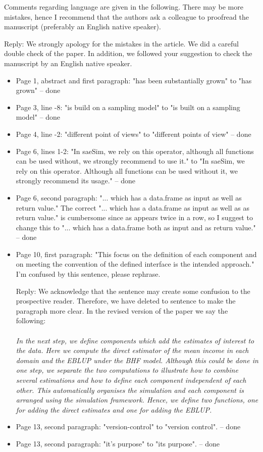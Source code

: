 \documentclass[11pt]{article}
\begin{document}
\vspace{0.5cm}

\noindent Comments regarding language are given in the following. There may be more mistakes, hence I recommend that the authors ask a colleague to proofread the manuscript (preferably an English native speaker).

\noindent Reply: We strongly apology for the mistakes in the article. We did a careful double check of the paper. In addition, we followed your suggestion to check the manuscript by an English native speaker.

\begin{itemize}
\item
	Page 1, abstract and first paragraph: "has been substantially grown" to "has grown" -- done
\item
	Page 3, line -8: "is build on a sampling model" to "is built on a sampling model" -- done
\item
	Page 4, line -2: "different point of views" to "different points of view" -- done
\item
	Page 6, lines 1-2: "In saeSim, we rely on this operator, although all functions can be used without, we strongly recommend to use it." to "In saeSim, we rely on this operator. Although all functions can be used without it, we strongly recommend its usage." -- done
\item
	Page 6, second paragraph: "... which has a data.frame as input as well as return value." The correct "... which has a data.frame as input as well as as return value." is cumbersome since as appears twice in a row, so I suggest to change this to "... which has a data.frame both as input and as return value."  -- done

\item
	Page 10, first paragraph: "This focus on the definition of each component and on meeting the convention of the defined interface is the intended approach." I'm confused by this sentence, please rephrase.
	
	Reply: We acknowledge that the sentence may create some confusion to the prospective reader. Therefore, we have deleted to sentence to make the paragraph more clear. In the revised version of the paper we say the following:\\\\
	\textit{
		In the next step, we define components which add the estimates of interest to the data. Here we compute the direct estimator of the mean income in each domain and the EBLUP under the BHF model. Although this could be done in one step, we separate the two computations to illustrate how to combine several estimations and how to define each component independent of each other. This automatically organises the simulation and each component is arranged using the simulation framework. Hence, we define two functions, one for adding the direct estimates and one for adding the EBLUP.
		}
\item
	Page 13, second paragraph: "version-control" to "version control". -- done
\item
	Page 13, second paragraph: "it's purpose" to "its purpose". -- done
\end{itemize}
\end{document}
